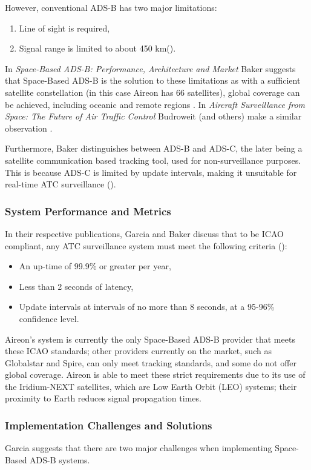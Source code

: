 \documentclass[stu, a4paper, 12pt, floatsintext]{apa7}
\numberwithin{figure}{section}
\numberwithin{table}{section}
\numberwithin{equation}{section}
\begin{document}
However, conventional ADS-B has two major limitations: 
\begin{enumerate}
    \item Line of sight is required,
    \item Signal range is limited to about 450 km(\cite{flightRadar}).
\end{enumerate}

In \textit{Space-Based ADS-B: Performance, Architecture and Market} Baker suggests that Space-Based ADS-B is the solution to these limitations as with a sufficient satellite constellation (in this case Aireon has 66 satellites), global coverage can be achieved, including oceanic and remote regions \cite{SpaceBasedADSBPerformanceArchitectureAndMarket}. In \textit{Aircraft Surveillance from Space: The Future of Air Traffic Control} Budroweit (and others) make a similar observation \cite{AircraftSurveillanceFromSpace}. 

Furthermore, Baker distinguishes between ADS-B and ADS-C, the later being a satellite communication based tracking tool, used for non-surveillance purposes. This is because ADS-C is limited by update intervals, making it unsuitable for real-time ATC surveillance (\cite{SpaceBasedADSBPerformanceArchitectureAndMarket}). 

\subsubsection{System Performance and Metrics}
In their respective publications, Garcia and Baker discuss that to be ICAO compliant, any ATC surveillance system must meet the following criteria (\cite{ICAO2007}):
\begin{itemize}
    \item An up-time of 99.9\% or greater per year,
    \item Less than 2 seconds of latency,
    \item Update intervals at intervals of no more than 8 seconds, at a 95-96\% confidence level.
\end{itemize}
Aireon’s system is currently the only Space-Based ADS-B provider that meets these ICAO standards; other providers currently on the market, such as Globalstar and Spire, can only meet tracking standards, and some do not offer global coverage. Aireon is able to meet these strict requirements due to its use of the Iridium-NEXT satellites, which are Low Earth Orbit (LEO) systems; their proximity to Earth reduces signal propagation times. 
\subsubsection{Implementation Challenges and Solutions}
Garcia suggests that there are two major challenges when implementing Space-Based ADS-B systems. 
\end{document}
